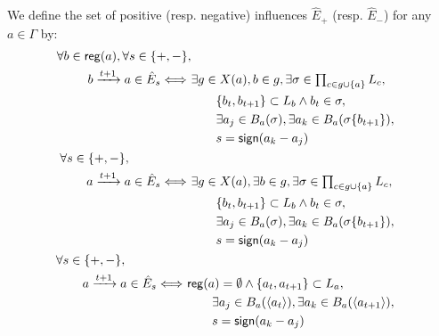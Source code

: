 \begin{proposition}\label{pps:inference-edges}
We define the set of positive (resp. negative) influences $\hat{E}_+$ (resp. $\hat{E}_-$) for any $a\in\Gamma$ by:
\begin{align}
\begin{split}\label{eq:edges-inference}
  \forall b\in\PHpredecgene{a}, \forall s \in \{ +, - \}, \\
  b \xrightarrow{t+1} a \in \hat{E}_s \Longleftrightarrow\ & \exists g \in X(a), b \in g,
  \exists \sigma \in \textstyle\prod_{c\in g \cup \{ a \}} \PHl_c, \\
    &\qquad \{ b_t, b_{t+1} \} \subset \PHl_b \wedge b_t \in \sigma,\\
    &\qquad \exists a_j \in \irB_a(\sigma), \exists a_k \in \irB_a(\sigma\{b_{t+1}\}), \\
    &\qquad s = \f{sign}(a_k - a_j)
\end{split}\\
%
%
\begin{split}\label{eq:edges-inference-auto}
  \forall s \in \{ +, - \}, \quad\qquad\qquad \\
  a \xrightarrow{t+1} a \in \hat{E}_s \Longleftrightarrow\ & \exists g \in X(a), \exists b \in g,
  \exists \sigma \in \textstyle\prod_{c\in g \cup \{ a \}} \PHl_c, \\
    &\qquad \{ b_t, b_{t+1} \} \subset \PHl_b \wedge b_t \in \sigma,\\
    &\qquad \exists a_j \in \irB_a(\sigma), \exists a_k \in \irB_a(\sigma\{b_{t+1}\}), \\
    &\qquad s = \f{sign}(a_k - a_j)
\end{split}\\
\begin{split}\label{eq:edges-inference-noreg}
  \forall s \in \{ +, - \}, \quad\qquad\qquad \\
  a \xrightarrow{t+1} a \in \hat{E}_s \Longleftrightarrow\ & \reg{a} = \emptyset \wedge \{ a_t, a_{t+1} \} \subset \PHl_a, \\
    &\qquad \exists a_j \in \irB_a(\PHetat{a_t}), \exists a_k \in \irB_a(\PHetat{a_{t+1}}), \\
    &\qquad s = \f{sign}(a_k - a_j)
\end{split}
%
%

\end{align}
\end{proposition}
